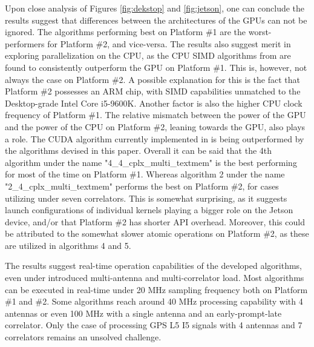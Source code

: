 \documentclass{juliacon}
\begin{document}
Upon close analysis of Figures \ref{fig:dekstop} and \ref{fig:jetson}, one can conclude the results suggest that differences between the architectures of the GPUs can not be ignored. The algorithms performing best on Platform \#1 are the worst-performers for Platform \#2, and vice-versa. The results also suggest merit in exploring parallelization on the CPU, as the CPU SIMD algorithms from \cite{Schoenbrod2022} are found to consistently outperform the GPU on Platform \#1. This is, however, not always the case on Platform \#2. A possible explanation for this is the fact that Platform \#2 possesses an ARM chip, with SIMD capabilities unmatched to the Desktop-grade Intel Core i5-9600K. Another factor is also the higher CPU clock frequency of Platform \#1. The relative mismatch between the power of the GPU and the power of the CPU on Platform \#2, leaning towards the GPU, also plays a role. The CUDA algorithm 
currently implemented in \cite{Schoenbrod2022} is being outperformed by the algorithms devised in this paper. Overall it can be said that the 4th algorithm under the name "4\_4\_cplx\_multi\_textmem" is the best performing for most of the time on Platform \#1. Whereas algorithm 2 under the name "2\_4\_cplx\_multi\_textmem" performs the best on Platform \#2, for cases utilizing under seven correlators. This is somewhat surprising, as it suggests launch configurations of individual kernels playing a bigger role on the Jetson device, and/or that Platform \#2 has shorter API overhead. Moreover, this could be attributed to the somewhat slower atomic operations on Platform \#2, as these are utilized in algorithms 4 and 5.

The results suggest real-time operation capabilities of the developed algorithms, even under introduced multi-antenna and multi-correlator load. Most algorithms can be executed in real-time under 20 MHz sampling frequency both on Platform \#1 and \#2. Some algorithms reach around 40 MHz processing capability with 4 antennas or even 100 MHz with a single antenna and an early-prompt-late correlator. Only the case of processing GPS L5 I5 signals with 4 antennas and 7 correlators remains an unsolved challenge.
\end{document}
